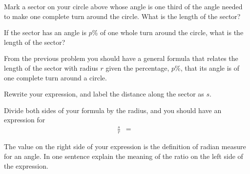 \begin{problem}
\begin{subproblem}
    \vspace{4em}

  \item Mark a sector on your circle above whose angle is one third of
    the angle needed to make one complete turn around the circle. What
    is the length of the sector?  


    \vspace{4em}

  \item If the sector has an angle is $p$\% of one whole turn around
    the circle, what is the length of the sector?
    \vspace{4em}

  \end{subproblem}

\clearpage

\item From the previous problem you should have a general formula that
  relates the length of the sector with radius $r$ given the
  percentage, $p$\%, that its angle is of one complete turn around a
  circle.

  \begin{subproblem}
  \item Rewrite your expression, and label the distance along the
    sector as $s$.
    \vfill
  \item Divide both sides of your formula by the radius, and you
    should have an expression for 
    \begin{eqnarray*}
    \frac{s}{r} & = & 
    \end{eqnarray*}

  \item The value on the right side of your expression is the
    definition of radian measure for an angle. In one sentence explain
    the meaning of the ratio on the left side of the expression.
    
    \vfill

  \end{subproblem}

  \clearpage


\end{problem}
